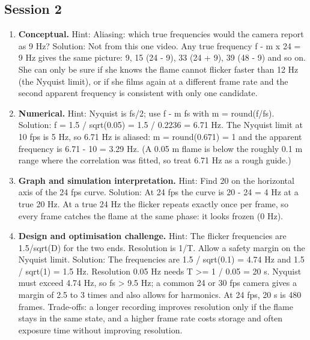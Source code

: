 \documentclass[11pt,a4paper]{article}
\begin{document}
\subsection*{Session 2}
\begin{enumerate}[nosep]
\item \textbf{Conceptual.} Hint: Aliasing: which true frequencies would the camera report as 9 Hz? Solution: Not from this one video. Any true frequency \textbar{}f - m x 24\textbar{} = 9 Hz gives the same picture: 9, 15 (24 - 9), 33 (24 + 9), 39 (48 - 9) and so on. She can only be sure if she knows the flame cannot flicker faster than 12 Hz (the Nyquist limit), or if she films again at a different frame rate and the second apparent frequency is consistent with only one candidate.
\item \textbf{Numerical.} Hint: Nyquist is fs/2; use \textbar{}f - m fs\textbar{} with m = round(f/fs). Solution: f = 1.5 / sqrt(0.05) = 1.5 / 0.2236 = 6.71 Hz. The Nyquist limit at 10 fps is 5 Hz, so 6.71 Hz is aliased: m = round(0.671) = 1 and the apparent frequency is \textbar{}6.71 - 10\textbar{} = 3.29 Hz. (A 0.05 m flame is below the roughly 0.1 m range where the correlation was fitted, so treat 6.71 Hz as a rough guide.)
\item \textbf{Graph and simulation interpretation.} Hint: Find 20 on the horizontal axis of the 24 fps curve. Solution: At 24 fps the curve is \textbar{}20 - 24\textbar{} = 4 Hz at a true 20 Hz. At a true 24 Hz the flicker repeats exactly once per frame, so every frame catches the flame at the same phase: it looks frozen (0 Hz).
\item \textbf{Design and optimisation challenge.} Hint: The flicker frequencies are 1.5/sqrt(D) for the two ends. Resolution is 1/T. Allow a safety margin on the Nyquist limit. Solution: The frequencies are 1.5 / sqrt(0.1) = 4.74 Hz and 1.5 / sqrt(1) = 1.5 Hz. Resolution 0.05 Hz needs T \textgreater{}= 1 / 0.05 = 20 s. Nyquist must exceed 4.74 Hz, so fs \textgreater{} 9.5 Hz; a common 24 or 30 fps camera gives a margin of 2.5 to 3 times and also allows for harmonics. At 24 fps, 20 s is 480 frames. Trade-offs: a longer recording improves resolution only if the flame stays in the same state, and a higher frame rate costs storage and often exposure time without improving resolution.
\end{enumerate}
\end{document}
